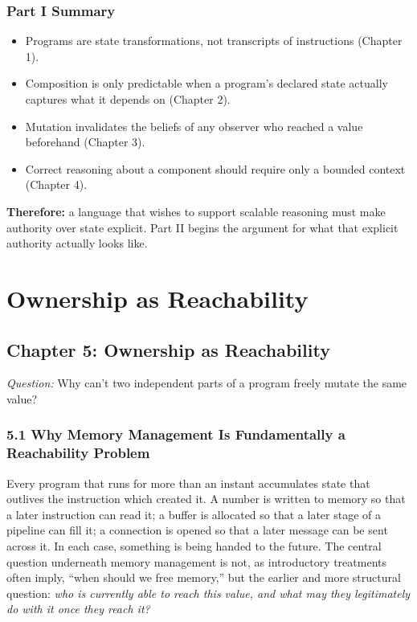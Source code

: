 \documentclass[11pt]{book}
\begin{document}
\clearpage

\section*{Part I Summary}

\begin{itemize}
\item Programs are state transformations, not transcripts of instructions (Chapter 1).
\item Composition is only predictable when a program's declared state actually captures what it depends on (Chapter 2).
\item Mutation invalidates the beliefs of any observer who reached a value beforehand (Chapter 3).
\item Correct reasoning about a component should require only a bounded context (Chapter 4).
\end{itemize}

\noindent\textbf{Therefore:} a language that wishes to support scalable reasoning must make authority over state explicit. Part II begins the argument for what that explicit authority actually looks like.



\clearpage

\part{Ownership as Reachability}


\clearpage

\chapter*{Chapter 5: Ownership as Reachability}

\begin{firstprinciples}
\textit{Question:} Why can't two independent parts of a program freely mutate the same value?
\end{firstprinciples}

\section*{5.1 Why Memory Management Is Fundamentally a Reachability Problem}

Every program that runs for more than an instant accumulates state that outlives the instruction which created it. A number is written to memory so that a later instruction can read it; a buffer is allocated so that a later stage of a pipeline can fill it; a connection is opened so that a later message can be sent across it. In each case, something is being handed to the future. The central question underneath memory management is not, as introductory treatments often imply, ``when should we free memory,'' but the earlier and more structural question: \emph{who is currently able to reach this value, and what may they legitimately do with it once they reach it?}
\end{document}
